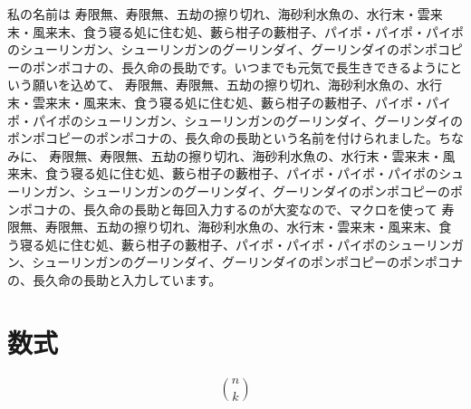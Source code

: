 \documentclass{ltjsarticle}
\newcommand{\jugem}{寿限無、寿限無、五劫の擦り切れ、海砂利水魚の、水行末・雲来末・風来末、食う寝る処に住む処、藪ら柑子の藪柑子、パイポ・パイポ・パイポのシューリンガン、シューリンガンのグーリンダイ、グーリンダイのポンポコピーのポンポコナの、長久命の長助}
\newcommand{\combination}[2]{\binom{#1}{#2}}
\begin{document}
私の名前は \jugem です。いつまでも元気で長生きできるようにという願いを込めて、 \jugem という名前を付けられました。ちなみに、 \jugem と毎回入力するのが大変なので、マクロを使って \jugem と入力しています。

\section{数式}
\[
\combination{n}{k}
\]
\end{document}
